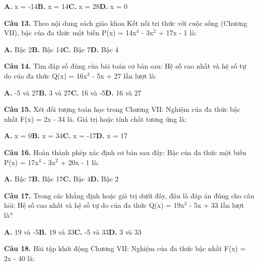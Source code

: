 \documentclass[11pt,a4paper]{article}
\begin{document}
\hspace*{1.5em}\textbf{A.} x = -14\quad\quad \textbf{B.} x = 14\quad\quad \textbf{C.} x = 28\quad\quad \textbf{D.} x = 0\par\vspace{2pt}
\textbf{\color{primary} Câu 13.} Theo nội dung sách giáo khoa Kết nối tri thức với cuộc sống (Chương VII), bậc của đa thức một biến P(x) = 14x$^4$ - 3x$^2$ + 17x - 1 là:\par
\hspace*{1.5em}\textbf{A.} Bậc 2\quad\quad \textbf{B.} Bậc 14\quad\quad \textbf{C.} Bậc 7\quad\quad \textbf{D.} Bậc 4\par\vspace{2pt}
\textbf{\color{primary} Câu 14.} Tìm đáp số đúng của bài toán cơ bản sau: Hệ số cao nhất và hệ số tự do của đa thức Q(x) = 16x$^3$ - 5x + 27 lần lượt là:\par
\hspace*{1.5em}\textbf{A.} -5 và 27\quad\quad \textbf{B.} 3 và 27\quad\quad \textbf{C.} 16 và -5\quad\quad \textbf{D.} 16 và 27\par\vspace{2pt}
\textbf{\color{primary} Câu 15.} Xét đối tượng toán học trong Chương VII: Nghiệm của đa thức bậc nhất F(x) = 2x - 34 là. Giá trị hoặc tính chất tương ứng là:\par
\hspace*{1.5em}\textbf{A.} x = 0\quad\quad \textbf{B.} x = 34\quad\quad \textbf{C.} x = -17\quad\quad \textbf{D.} x = 17\par\vspace{2pt}
\textbf{\color{primary} Câu 16.} Hoàn thành phép xác định cơ bản sau đây: Bậc của đa thức một biến P(x) = 17x$^4$ - 3x$^2$ + 20x - 1 là:\par
\hspace*{1.5em}\textbf{A.} Bậc 7\quad\quad \textbf{B.} Bậc 17\quad\quad \textbf{C.} Bậc 4\quad\quad \textbf{D.} Bậc 2\par\vspace{2pt}
\textbf{\color{primary} Câu 17.} Trong các khẳng định hoặc giá trị dưới đây, đâu là đáp án đúng cho câu hỏi: Hệ số cao nhất và hệ số tự do của đa thức Q(x) = 19x$^3$ - 5x + 33 lần lượt là?\par
\hspace*{1.5em}\textbf{A.} 19 và -5\quad\quad \textbf{B.} 19 và 33\quad\quad \textbf{C.} -5 và 33\quad\quad \textbf{D.} 3 và 33\par\vspace{2pt}
\textbf{\color{primary} Câu 18.} Bài tập khởi động Chương VII: Nghiệm của đa thức bậc nhất F(x) = 2x - 40 là:\par
\end{document}

